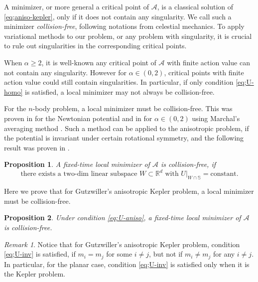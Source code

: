 \documentclass[11pt]{amsart}
\newcommand{\rr}{\mathbb R}
\newcommand{\A}{\mathcal A}
\newcommand{\bs}{\mathbb S}
\newcommand{\al}{\alpha}
\theoremstyle{plain}
\newtheorem{prop}{Proposition}[section]
\theoremstyle{definition}
\theoremstyle{remark}
\newtheorem{rem}{Remark}[section]
\begin{document}
A minimizer, or more general a critical point of $\A$, is a classical solution of \eqref{eq;aniso-kepler}, only if it does not contain any singularity. We call such a minimizer \emph{collision-free}, following notations from celestial mechanics. To apply variational methods to our problem, or any problem with singularity, it is crucial to rule out singularities in the corresponding critical points.

When $\al \ge 2$, it is well-known any critical point of $\A$ with finite action value can not contain any singularity. However for $\al \in (0, 2)$, critical points with finite action value could still contain singularities. In particular, if only condition \eqref{eq;U-homo} is satisfied, a local minimizer may not always be collision-free. 

For the $n$-body problem, a local minimizer must be collision-free. This was proven in \cite{C02} for the Newtonian potential and in \cite{FT04} for $\al \in (0, 2)$ using Marchal's averaging method \cite{Mc02}. Such a method can be applied to the anisotropic problem, if the potential is invariant under certain rotational symmetry, and the following result was proven in \cite{BFT08}. 

\begin{prop}{\cite[Theorem 6.1]{BFT08}} \label{prop;coll-free-1}
	A fixed-time local minimizer of $\A$ is collision-free, if
\begin{equation}
\label{eq;U-inv} \text{there exists a two-dim linear subspace } W \subset \rr^d \text{ with } U|_{W \cap \bs} = \text{constant}. \tag{U2}
\end{equation}
\end{prop}

Here we prove that for Gutzwiller's anisotropic Kepler problem, a local minimizer must be collision-free. 

\begin{prop} \label{prop;coll-free-2}
Under condition \eqref{eq;U-aniso}, a fixed-time local minimizer of $\A$ is collision-free.  
\end{prop}

\begin{rem}
Notice that for Gutzwiller's anisotropic Kepler problem, condition \eqref{eq;U-inv} is satisfied, if $m_i = m_j$ for some $i \ne j$, but not if $m_i \ne m_j$ for any $i \ne j$. In particular, for the planar case, condition \eqref{eq;U-inv} is satisfied only when it is the Kepler problem.  
\end{rem}
\end{document}
